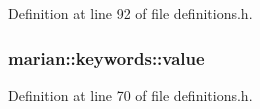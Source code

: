 Definition at line 92 of file definitions.\+h.

\subsubsection[{\texorpdfstring{value}{value}}]{ marian\+::keywords\+::value}\hypertarget{namespacemarian_1_1keywords_ac70de1b4c3cf6b7080cf5086f2963fd8}{}\label{namespacemarian_1_1keywords_ac70de1b4c3cf6b7080cf5086f2963fd8}


Definition at line 70 of file definitions.\+h.

